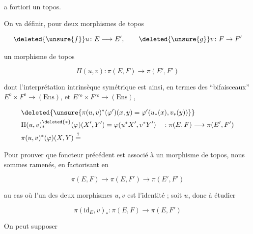 a fortiori un topos.


On va définir, pour deux morphismes de topos

\[
\deleted{\unsure{f}}u\colon E\longrightarrow E',\qquad \deleted{\unsure{g}}v\colon F\to F'
\]

un morphisme de topos

\[
\Pi(u,v)\colon\pi(E,F)\longrightarrow\pi(E',F')
\]

dont l'interprétation intrinsèque symétrique est ainsi, en termes des ``bifaisceaux'' $E^o\times F^o\longrightarrow(\mathrm{Ens})$, et $E'{}^o\times F'{}^o\longrightarrow(\mathrm{Ens})$,

\[
\begin{aligned}
&\deleted{\unsure{\pi(u,v)^*(\varphi')(x,y)=\varphi'(u_*(x),v_*(y))}}\\
&\Pi(u,v)_{\ast}^{\deleted{\ast}}(\varphi)(X',Y')=\varphi(u^*X',v^*Y')\quad:\pi(E,F)\longrightarrow\pi(E',F')\\
&\pi(u,v)^*(\varphi)(X,Y)\overset{?}{=}
\end{aligned}
\]

Pour prouver que  foncteur précédent est associé à un morphisme de topos, nous sommes ramenés, en  factorisant en

\[
\pi(E,F)\longrightarrow\pi(E,F')\longrightarrow\pi(E',F')
\]

au cas où l'un des deux morphismes $u,v$ est l'identité ; soit $u$, donc à étudier

\[
\pi(\mathrm{id}_E,v)_*\colon\pi(E,F)\longrightarrow\pi(E,F')
\]

On peut supposer 


